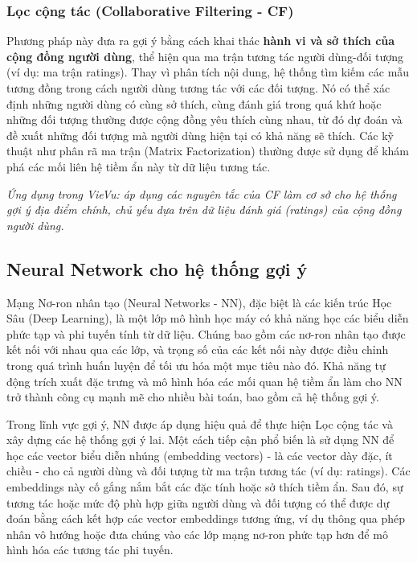 \subsubsection{Lọc cộng tác (Collaborative Filtering - CF)\cite{cf_concept}} 
Phương pháp này đưa ra gợi ý bằng cách khai thác \textbf{hành vi và sở thích của cộng đồng người dùng}, thể hiện qua ma trận tương tác người dùng-đối tượng (ví dụ: ma trận ratings). Thay vì phân tích nội dung, hệ thống tìm kiếm các mẫu tương đồng trong cách người dùng tương tác với các đối tượng. Nó có thể xác định những người dùng có cùng sở thích, cùng đánh giá trong quá khứ hoặc những đối tượng thường được cộng đồng yêu thích cùng nhau, từ đó dự đoán và đề xuất những đối tượng mà người dùng hiện tại có khả năng sẽ thích. Các kỹ thuật như phân rã ma trận (Matrix Factorization) thường được sử dụng để khám phá các mối liên hệ tiềm ẩn này từ dữ liệu tương tác.

\textit{Ứng dụng trong VieVu: áp dụng các nguyên tắc của CF làm cơ sở cho hệ thống gợi ý địa điểm chính, chủ yếu dựa trên dữ liệu đánh giá (ratings) của cộng đồng người dùng.}

\subsection{Neural Network cho hệ thống gợi ý}

Mạng Nơ-ron nhân tạo (Neural Networks - NN), đặc biệt là các kiến trúc Học Sâu (Deep Learning), là một lớp mô hình học máy có khả năng học các biểu diễn phức tạp và phi tuyến tính từ dữ liệu. Chúng bao gồm các nơ-ron nhân tạo được kết nối với nhau qua các lớp, và trọng số của các kết nối này được điều chỉnh trong quá trình huấn luyện để tối ưu hóa một mục tiêu nào đó. Khả năng tự động trích xuất đặc trưng và mô hình hóa các mối quan hệ tiềm ẩn làm cho NN trở thành công cụ mạnh mẽ cho nhiều bài toán, bao gồm cả hệ thống gợi ý.

Trong lĩnh vực gợi ý, NN được áp dụng hiệu quả để thực hiện Lọc cộng tác và xây dựng các hệ thống gợi ý lai. Một cách tiếp cận phổ biến là sử dụng NN để học các vector biểu diễn nhúng (embedding vectors) - là các vector dày đặc, ít chiều - cho cả người dùng và đối tượng từ ma trận tương tác (ví dụ: ratings). Các embeddings này cố gắng nắm bắt các đặc tính hoặc sở thích tiềm ẩn. Sau đó, sự tương tác hoặc mức độ phù hợp giữa người dùng và đối tượng có thể được dự đoán bằng cách kết hợp các vector embeddings tương ứng, ví dụ thông qua phép nhân vô hướng hoặc đưa chúng vào các lớp mạng nơ-ron phức tạp hơn để mô hình hóa các tương tác phi tuyến.

